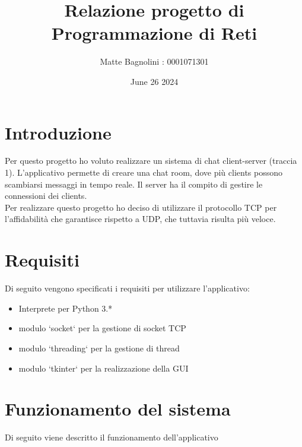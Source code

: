 \documentclass{article}
\title{Relazione progetto di Programmazione di Reti}
\author{Matte Bagnolini : 0001071301}
\date{June 26 2024}
\begin{document}
\maketitle

\newpage

\tableofcontents

\newpage

\section{Introduzione}

Per questo progetto ho voluto realizzare un sistema di chat client-server (traccia 1). L'applicativo permette di creare una chat room, dove più clients possono scambiarsi messaggi in tempo reale. Il server ha il compito di gestire le connessioni dei clients.\\
Per realizzare questo progetto ho deciso di utilizzare il protocollo TCP per l'affidabilità che garantisce rispetto a UDP, che tuttavia risulta più veloce.

\newpage

\section{Requisiti}
Di seguito vengono specificati i requisiti per utilizzare l'applicativo:
\begin{itemize}
    \item Interprete per Python 3.*
    \item modulo `socket` per la gestione di socket TCP
    \item modulo `threading` per la gestione di thread
    \item modulo `tkinter` per la realizzazione della GUI
\end{itemize}

\newpage

\section{Funzionamento del sistema}
Di seguito viene descritto il funzionamento dell'applicativo
\end{document}
